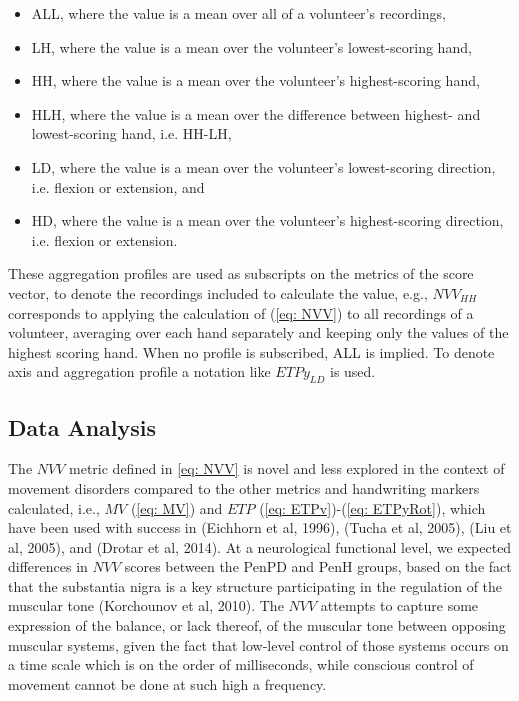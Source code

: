 \begin{itemize}
\item ALL, where the value is a mean over all of a volunteer's recordings,
\item LH, where the value is a mean over the volunteer's lowest-scoring hand,
\item HH, where the value is a mean over the volunteer's highest-scoring hand,
\item HLH, where the value is a mean over the difference between highest- and lowest-scoring hand, i.e. HH-LH,
\item LD, where the value is a mean over the volunteer's lowest-scoring direction, i.e. flexion or extension, and
\item HD, where the value is a mean over the volunteer's highest-scoring direction, i.e. flexion or extension.
\end{itemize}

These aggregation profiles are used as subscripts on the metrics of the score vector, to denote the recordings included to calculate the value, e.g., $NVV_{HH}$ corresponds to applying the calculation of (\ref{eq: NVV}) to all recordings of a volunteer, averaging over each hand separately and keeping only the values of the highest scoring hand. When no profile is subscribed, ALL is implied. To denote axis and aggregation profile a notation like $ETPy_{LD}$ is used. 

\subsection{Data Analysis}
\label{subsec:PenCTAnalysis}
The $NVV$ metric defined in \ref{eq: NVV} is novel and less explored in the context of movement disorders compared to the other metrics and handwriting markers calculated, i.e., $MV$ (\ref{eq: MV}) and $ETP$ (\ref{eq: ETPv})-(\ref{eq: ETPyRot}), which have been used with success in (Eichhorn et al, 1996), (Tucha et al, 2005), (Liu et al, 2005), and (Drotar et al, 2014). At a neurological functional level, we expected differences in $NVV$ scores between the \gls{PenPD} and \gls{PenH} groups, based on the fact that the substantia nigra is a key structure participating in the regulation of the muscular tone (Korchounov et al, 2010). The $NVV$ attempts to capture some expression of the balance, or lack thereof, of the muscular tone between opposing muscular systems, given the fact that low-level control of those systems occurs on a time scale which is on the order of milliseconds, while conscious control of movement cannot be done at such high a frequency. 

